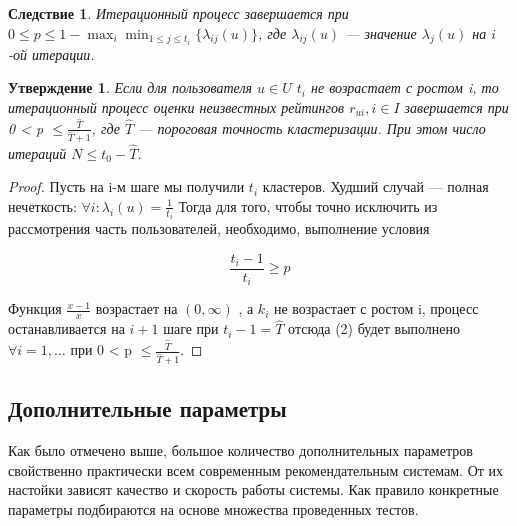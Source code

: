 \documentclass[a4paper, 12pt]{article} %
\newtheorem{statement}{Утверждение}
\newtheorem{consequence}{Следствие}
\begin{document}
\begin{consequence}
Итерационный процесс завершается при $0 \leq p \leq 1 - \max_{i}\min_{1 \leq j \leq t_{i}}\{\lambda_{ij}(u)\}$, где $\lambda_{ij}(u) $ --- значение $\lambda_{j}(u)$ на $i$-ой итерации.
\end{consequence}


\begin{statement}
Если для пользователя $u \in U$ $t_{i} $ не возрастает с ростом i, то итерационный процесс оценки неизвестных рейтингов $r_{ui}, i \in I$ завершается при  0 < p $\leq \frac {\hat{T}}{\hat{T}+1}$, где $\hat{T}$ --- пороговая точность кластеризации. При этом число итераций $N \leq  t_{0} - \hat{T}$.
\end{statement}
\begin{proof}

Пусть на i-м шаге мы получили $t_{i}$ кластеров. 
Худший случай --- полная нечеткость: $\forall i: \lambda_{i}(u) = \frac{1}{t_{i}}$
Тогда для того, чтобы точно исключить из рассмотрения часть пользователей, необходимо, выполнение условия 

\begin{equation}
	\frac{t_{i} - 1}{t_{i}} \geq p
\end{equation}

Функция $\frac{x-1}{x}$ возрастает на $(0, \infty)$ , а $k_{i} $ не возрастает с ростом i, процесс останавливается на $i+1$ шаге при $t_{i} - 1=\hat{T}$ отсюда (2) будет выполнено $\forall i = 1,\dots$ при 0 < p $\leq \frac {\hat{T}}{\hat{T}+1}$.

\end{proof}



\subsection{Дополнительные параметры}

Как было отмечено выше, большое количество дополнительных параметров свойственно практически всем современным рекомендательным системам. От их настойки зависят качество и скорость работы системы. Как правило конкретные параметры подбираются на основе множества проведенных тестов. 
\end{document}
